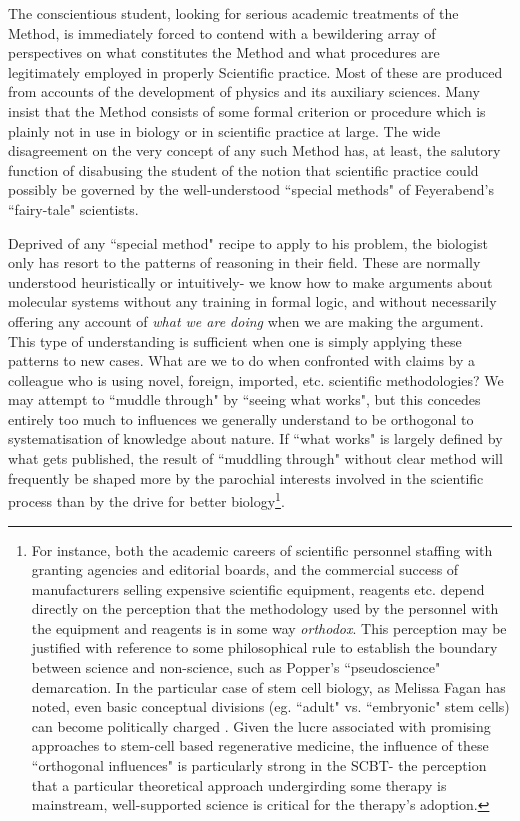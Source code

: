 The conscientious student, looking for serious academic treatments of the Method, is immediately forced to contend with a bewildering array of perspectives on what constitutes the Method and what procedures are legitimately employed in properly Scientific practice. Most of these are produced from accounts of the development of physics and its auxiliary sciences. Many insist that the Method consists of some formal criterion or procedure which is plainly not in use in biology or in scientific practice at large. The wide disagreement on the very concept of any such Method has, at least, the salutory function of disabusing the student of the notion that scientific practice could possibly be governed by the well-understood ``special methods" of Feyerabend's ``fairy-tale" scientists.

Deprived of any ``special method" recipe to apply to his problem, the biologist only has resort to the patterns of reasoning in their field. These are normally understood heuristically or intuitively- we know how to make arguments about molecular systems without any training in formal logic, and without necessarily offering any account of \textit{what we are doing} when we are making the argument. This type of understanding is sufficient when one is simply applying these patterns to new cases. What are we to do when confronted with claims by a colleague who is using novel, foreign, imported, etc. scientific methodologies? We may attempt to ``muddle through" by ``seeing what works", but this concedes entirely too much to influences we generally understand to be orthogonal to systematisation of knowledge about nature. If ``what works" is largely defined by what gets published, the result of ``muddling through" without clear method will frequently be shaped more by the parochial interests involved in the scientific process than by the drive for better biology\footnote{For instance, both the academic careers of scientific personnel staffing with granting agencies and editorial boards, and the commercial success of manufacturers selling expensive scientific equipment, reagents etc. depend directly on the perception that the methodology used by the personnel with the equipment and reagents is in some way \textit{orthodox}. This perception may be justified with reference to some philosophical rule to establish the boundary between science and non-science, such as Popper's ``pseudoscience" demarcation. In the particular case of stem cell biology, as Melissa Fagan has noted, even basic conceptual divisions (eg. ``adult" vs. ``embryonic" stem cells) can become politically charged \cite[p.47]{Fagan2013}. Given the lucre associated with promising approaches to stem-cell based regenerative medicine, the influence of these ``orthogonal influences" is particularly strong in the SCBT- the perception that a particular theoretical approach undergirding some therapy is mainstream, well-supported science is critical for the therapy's adoption.}.

